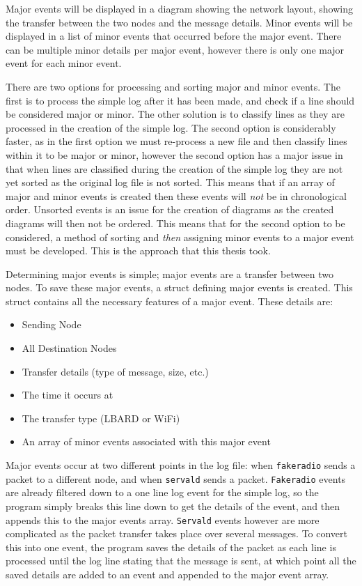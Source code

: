 Major events will be displayed in a diagram showing the network layout, showing the transfer between the two nodes and the message details. 
Minor events will be displayed in a list of minor events that occurred before the major event.
There can be multiple minor details per major event, however there is only one major event for each minor event.

There are two options for processing and sorting major and minor events.
The first is to process the simple log after it has been made, and check if a line should be considered major or minor. 
The other solution is to classify lines as they are processed in the creation of the simple log.
The second option is considerably faster, as in the first option we must re-process a new file and then classify lines within it to be major or minor, however the second option has a major issue in that when lines are classified during the creation of the simple log they are not yet sorted as the original log file is not sorted.
This means that if an array of major and minor events is created then these events will \emph{not} be in chronological order.
Unsorted events is an issue for the creation of diagrams as the created diagrams will then not be ordered.
This means that for the second option to be considered, a method of sorting and \emph{then} assigning minor events to a major event must be developed.
This is the approach that this thesis took.

Determining major events is simple; major events are a transfer between two nodes.
To save these major events, a struct defining major events is created.
This struct contains all the necessary features of a major event. These details are:
\begin{itemize}
    \item Sending Node
    \item All Destination Nodes
    \item Transfer details (type of message, size, etc.)
    \item The time it occurs at
    \item The transfer type (LBARD or WiFi)
    \item An array of minor events associated with this major event
\end{itemize}
Major events occur at two different points in the log file: when \texttt{fakeradio} sends a packet to a different node, and when \texttt{servald} sends a packet.
\texttt{Fakeradio} events are already filtered down to a one line log event for the simple log, so the program simply breaks this line down to get the details of the event, and then appends this to the major events array.
\texttt{Servald} events however are more complicated as the packet transfer takes place over several messages.
To convert this into one event, the program saves the details of the packet as each line is processed until the log line stating that the message is sent, at which point all the saved details are added to an event and appended to the major event array.

